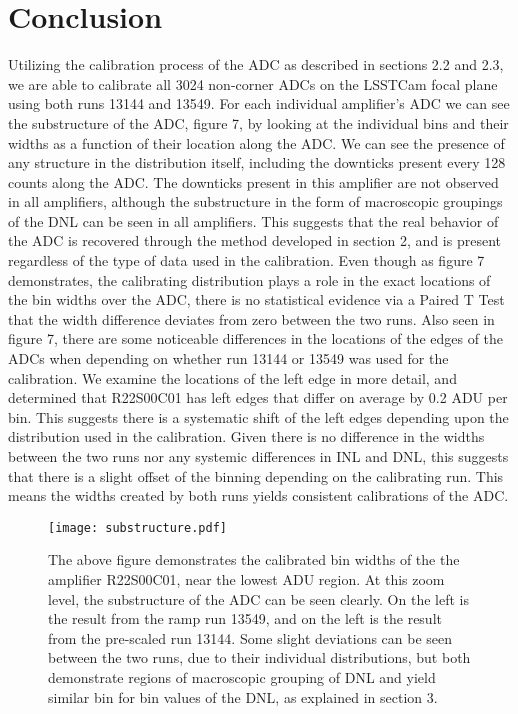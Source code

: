 \documentclass[11pt, letterpaper]{article}
\begin{document}
\section{Conclusion}
\indent


Utilizing the calibration process of the ADC as described in sections 2.2 and 2.3, we are able to calibrate all 3024 non-corner ADCs on the LSSTCam focal plane using both runs 13144 and 13549. 
For each individual amplifier’s ADC we can see the substructure of the ADC, figure 7, by looking at the individual bins and their widths as a function of their location along the ADC. 
We can see the presence of any structure in the distribution itself, including the downticks present every 128 counts along the ADC. 
The downticks present in this amplifier are not observed in all amplifiers, although the substructure in the form of macroscopic groupings of the DNL can be seen in all amplifiers.
This suggests that the real behavior of the ADC is recovered through the method developed in section 2, and is present regardless of the type of data used in the calibration.
Even though as figure 7 demonstrates, the calibrating distribution plays a role in the exact locations of the bin widths over the ADC, there is no statistical evidence via a Paired T Test that the width difference deviates from zero between the two runs.  
Also seen in figure 7, there are some noticeable differences in the locations of the edges of the ADCs when depending on whether run 13144 or 13549 was used for the calibration.
We examine the locations of the left edge in more detail, and determined that R22S00C01 has left edges that differ on average by 0.2 ADU per bin. 
This suggests there is a systematic shift of the left edges depending upon the distribution used in the calibration.
Given there is no difference in the widths between the two runs nor any systemic differences in INL and DNL, this suggests that there is a slight offset of the binning depending on the calibrating run.
This means the widths created by both runs yields consistent calibrations of the ADC. 
\begin{figure}
	\texttt{[image: substructure.pdf]}
	\caption{The above figure demonstrates the calibrated bin widths of the the amplifier R22S00C01, near the lowest ADU region. At this zoom level, the substructure of the ADC can be seen clearly. On the left is the result from the ramp run 13549, and on the left is the result from the pre-scaled run 13144.  Some slight deviations can be seen between the two runs, due to their individual distributions, but both demonstrate regions of macroscopic grouping of DNL and yield similar bin for bin values of the DNL, as explained in section 3.}
\end{figure}
\indent 
\end{document}
